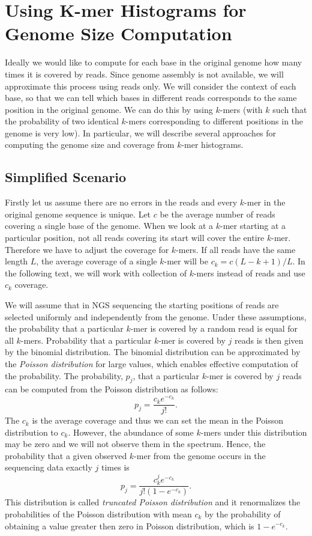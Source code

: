 \section[K-mer Histograms]{Using K-mer Histograms for Genome Size Computation}\label{sec:kmerhist}

Ideally we would like to compute for each base in the original genome how many times it is covered by reads. Since genome assembly is not available, we will approximate this process using reads only. We will consider the context of each base, so that we can tell which bases in different reads corresponds to the same position in the original genome. We can do this by using $k$-mers (with $k$ such that the probability of two identical $k$-mers corresponding to different positions in the genome is very low). In particular, we will describe several approaches for computing the genome size and coverage from $k$-mer histograms.


\subsection{Simplified Scenario}

Firstly let us assume there are no errors in the reads and every $k$-mer in the original genome sequence is unique.
Let $c$ be the average number of reads covering a single base of the genome. When we look at a $k$-mer starting at a particular position, not all reads covering its start will cover the entire $k$-mer.
Therefore we have to adjust the coverage for $k$-mers.
If all reads have the same length $L$, the average coverage of a single $k$-mer will be $c_k = c (L - k + 1)/L$.
In the following text, we will work with collection of $k$-mers instead of reads and use $c_k$ coverage.

We will assume that in NGS sequencing the starting positions of reads are selected uniformly and independently from the genome.
Under these assumptions, the probability that a particular $k$-mer is covered by a random read is equal for all $k$-mers. Probability that a particular $k$-mer is covered by $j$ reads is then given by the binomial distribution. The binomial distribution can be approximated by the \emph{Poisson distribution} for large values, which enables effective computation of the probability.
The probability, $p_j$, that a particular $k$-mer is covered by $j$ reads can be computed from the Poisson distribution as follows:
$$ p_j =  \frac{c_k e^{-c_k}}{j!}.$$
The $c_k$ is the average coverage and thus we can set the mean in the Poisson distribution to $c_k$.
However, the abundance of some $k$-mers under this distribution may be zero and we will not observe them in the spectrum. Hence, the probability that a given observed $k$-mer from the genome occurs in the sequencing data exactly $j$ times is $$p_j = \frac{c_k^j e^{-c_k}}{j! (1-e^{-c_k})}.$$
This distribution is called \emph{truncated Poisson distribution} and it renormalizes the probabilities of the Poisson distribution with mean $c_k$ by the probability of obtaining a value greater then zero in Poisson distribution, which is $1-e^{-c_k}$.

